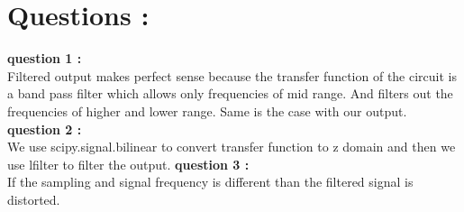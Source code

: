 \documentclass{article}
\begin{document}
\section{Questions :}
\textbf{question 1 :}
\\ Filtered output makes perfect sense because the transfer function of the circuit is a band pass filter which allows only frequencies of mid range. And filters out the frequencies of higher and lower range. Same is the case with our output.
\textbf{question 2 :}
\\ We use scipy.signal.bilinear to convert transfer function to z domain and then we use lfilter to filter the output.
\textbf{question 3 :}
\\ If the sampling and signal frequency is different than the filtered signal is distorted.
\end{document}
